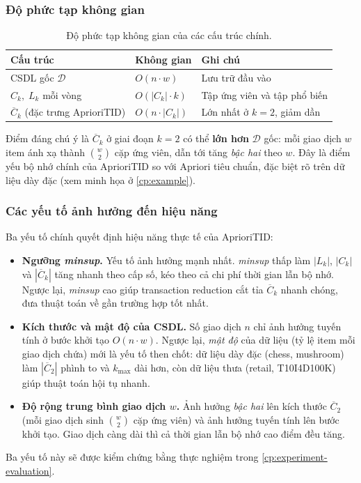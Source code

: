 \subsubsection{Độ phức tạp không gian}
\begin{table}[h!]
\centering
\begin{tabular}{lll}
\hline
\textbf{Cấu trúc} & \textbf{Không gian} & \textbf{Ghi chú} \\
\hline
CSDL gốc $\mathcal{D}$   & $O(n \cdot w)$        & Lưu trữ đầu vào \\
$C_k,\; L_k$ mỗi vòng   & $O(|C_k| \cdot k)$   & Tập ứng viên và tập phổ biến \\
$\overline{C}_k$ (đặc trưng AprioriTID) & $O(n \cdot |C_k|)$ & Lớn nhất ở $k = 2$, giảm dần \\
\hline
\end{tabular}
\caption{Độ phức tạp không gian của các cấu trúc chính.}
\label{tab:complexity-space}
\end{table}

\noindent Điểm đáng chú ý là $\overline{C}_k$ ở giai đoạn $k = 2$ có thể \textbf{lớn hơn} $\mathcal{D}$ gốc: mỗi giao dịch $w$ item ánh xạ thành $\binom{w}{2}$ cặp ứng viên, dẫn tới tăng \textit{bậc hai} theo $w$. Đây là điểm yếu bộ nhớ chính của AprioriTID so với Apriori tiêu chuẩn, đặc biệt rõ trên dữ liệu dày đặc (xem minh họa ở \autoref{cp:example}).

\subsubsection{Các yếu tố ảnh hưởng đến hiệu năng}
Ba yếu tố chính quyết định hiệu năng thực tế của AprioriTID:
\begin{itemize}[nosep,topsep=2pt]
    \item \textbf{Ngưỡng \textit{minsup}.} Yếu tố ảnh hưởng mạnh nhất. \textit{minsup} thấp làm $|L_k|$, $|C_k|$ và $|\overline{C}_k|$ tăng nhanh theo cấp số, kéo theo cả chi phí thời gian lẫn bộ nhớ. Ngược lại, \textit{minsup} cao giúp transaction reduction cắt tỉa $\overline{C}_k$ nhanh chóng, đưa thuật toán về gần trường hợp tốt nhất.
    \item \textbf{Kích thước và mật độ của CSDL.} Số giao dịch $n$ chỉ ảnh hưởng tuyến tính ở bước khởi tạo $O(n \cdot w)$. Ngược lại, \textit{mật độ} của dữ liệu (tỷ lệ item mỗi giao dịch chứa) mới là yếu tố then chốt: dữ liệu dày đặc (chess, mushroom) làm $|\overline{C}_2|$ phình to và $k_{\max}$ dài hơn, còn dữ liệu thưa (retail, T10I4D100K) giúp thuật toán hội tụ nhanh.
    \item \textbf{Độ rộng trung bình giao dịch $w$.} Ảnh hưởng \textit{bậc hai} lên kích thước $\overline{C}_2$ (mỗi giao dịch sinh $\binom{w}{2}$ cặp ứng viên) và ảnh hưởng tuyến tính lên bước khởi tạo. Giao dịch càng dài thì cả thời gian lẫn bộ nhớ cao điểm đều tăng.
\end{itemize}
\noindent Ba yếu tố này sẽ được kiểm chứng bằng thực nghiệm trong \autoref{cp:experiment-evaluation}.

